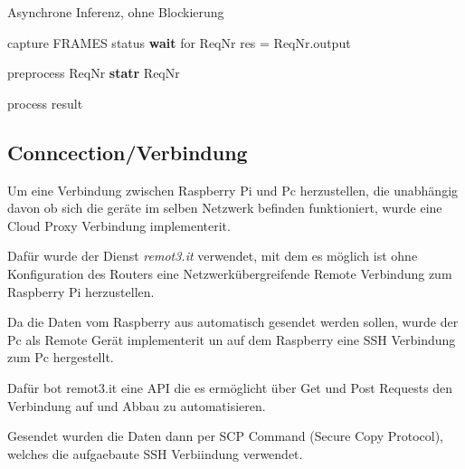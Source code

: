 \begin{algorithm}[H]
    \caption{Asynchrone Inferenz, ohne Blockierung}
    \begin{algorithmic}
    \WHILE{\TRUE}
    \STATE capture FRAMES
            \STATE status \textbf{wait} for ReqNr
                \STATE res = ReqNr.output
            \ENDIF
            
                \STATE preprocess ReqNr
                \STATE \textbf{statr} ReqNr
            \ENDIF

                \STATE process result
            \ENDIF
        \ENDFOR
    \ENDWHILE
    \end{algorithmic}
\end{algorithm}    



\subsection{Conncection/Verbindung}


Um eine Verbindung zwischen Raspberry Pi und Pc herzustellen, 
die unabhängig davon ob sich die geräte im selben 
Netzwerk befinden funktioniert, wurde eine Cloud Proxy Verbindung 
implementerit.

Dafür wurde der Dienst \textit{remot3.it} \cite{remoteit} verwendet, 
mit dem es möglich ist ohne Konfiguration des Routers eine
Netzwerkübergreifende Remote Verbindung zum Raspberry Pi herzustellen.

Da die Daten vom Raspberry aus automatisch gesendet werden sollen, 
wurde der Pc als Remote Gerät implementerit un auf dem Raspberry 
eine SSH Verbindung zum Pc hergestellt.


\begin{figure}[H]
    \centering
    \def\svgwidth{0.7\textwidth}
    
    \caption{}
    \label{}
\end{figure}


Dafür bot remot3.it eine API die es ermöglicht über Get und Post Requests
den Verbindung auf und Abbau zu automatisieren.

Gesendet wurden die Daten dann per SCP Command (Secure Copy Protocol), 
welches die aufgaebaute SSH Verbiindung verwendet.













